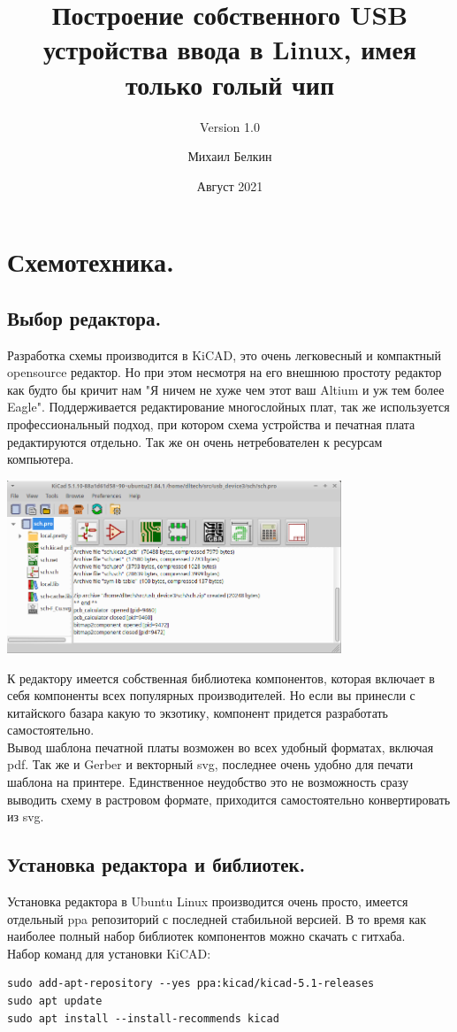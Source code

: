 \documentclass[12pt,a4paper]{scrbook} %
\title{Построение собственного USB устройства ввода в Linux, имея только голый чип}
\subtitle{Version 1.0}
\author{Михаил Белкин}
\date{Август 2021}
\begin{document}
\maketitle
\tableofcontents

\section{Схемотехника.}
\subsection{Выбор редактора.}
    Разработка схемы производится в KiCAD, это очень легковесный и компактный
    opensource редактор. Но при этом несмотря на его внешнюю простоту редактор
    как будто бы кричит нам "Я ничем не хуже чем этот ваш Altium и уж тем более
    Eagle". Поддерживается редактирование многослойных плат, так же используется
    профессиональный подход, при котором схема устройства и печатная плата
    редактируются отдельно. Так же он очень нетребователен к ресурсам
    компьютера.

\includegraphics[width=10cm]{kicad1.png}

    К редактору имеется собственная библиотека компонентов, которая включает в
    себя компоненты всех популярных производителей. Но если вы принесли
    с китайского базара какую то экзотику, компонент придется разработать
    самостоятельно.\\
    Вывод шаблона печатной платы возможен во всех удобный форматах, включая pdf.
    Так же и Gerber и векторный svg, последнее очень удобно для печати шаблона
    на принтере. Единственное неудобство это не возможность сразу выводить схему
    в растровом формате, приходится самостоятельно конвертировать из svg.
\subsection{Установка редактора и библиотек.}
    Установка редактора в Ubuntu Linux производится очень просто, имеется
    отдельный ppa репозиторий с последней стабильной версией. В то время как
    наиболее полный набор библиотек компонентов можно скачать с гитхаба.\\
    Набор команд для установки KiCAD:
\lstset{language=bash}           %
\begin{lstlisting}
sudo add-apt-repository --yes ppa:kicad/kicad-5.1-releases
sudo apt update
sudo apt install --install-recommends kicad
\end{lstlisting}
\end{document}

